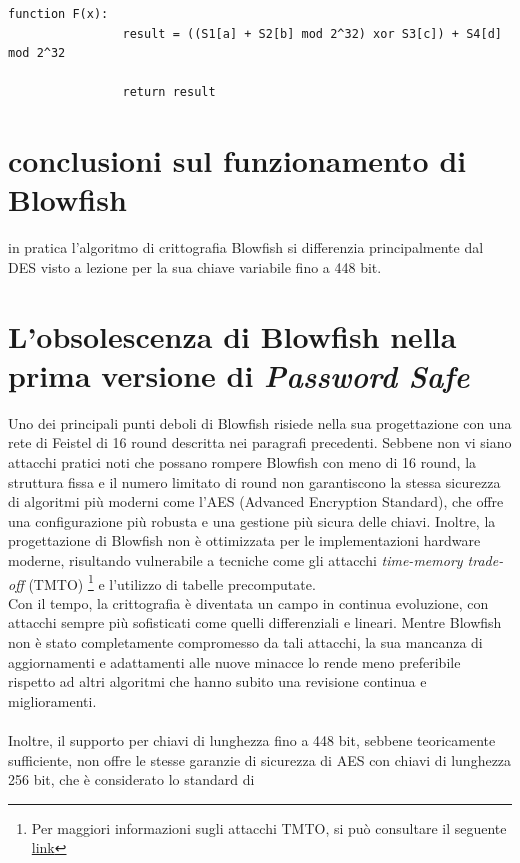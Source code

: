 \documentclass[a4paper,12pt]{report}
\begin{document}
		\begin{lstlisting}[style=pseudocode]
			function F(x):
				result = ((S1[a] + S2[b] mod 2^32) xor S3[c]) + S4[d] mod 2^32
				
				return result
		\end{lstlisting}
		\section*{conclusioni sul funzionamento di Blowfish}
		in pratica l'algoritmo di crittografia Blowfish si differenzia
		principalmente dal DES visto a lezione per la sua chiave variabile fino a
		448 bit. \cite{blfh-lenth-key}

		\section*{L'obsolescenza di Blowfish nella prima versione di
		\textit{Password Safe}}
			Uno dei principali punti deboli di Blowfish risiede nella sua
			progettazione con una rete di Feistel di 16 round descritta nei
			paragrafi precedenti. Sebbene non vi siano attacchi pratici noti che
			possano rompere Blowfish con meno di 16 round, la struttura fissa e il
			numero limitato di round non garantiscono la stessa sicurezza di
			algoritmi più moderni come l'AES (Advanced Encryption Standard), che
			offre una configurazione più robusta e una gestione più sicura delle
			chiavi. Inoltre, la progettazione di Blowfish non è ottimizzata per le
			implementazioni hardware moderne, risultando vulnerabile a tecniche come
			gli attacchi \textit{time-memory trade-off} (TMTO) \footnote{Per
			maggiori informazioni sugli attacchi TMTO, si può consultare il seguente
			\href{https://en.wikipedia.org/wiki/Time/Memory/Data_Tradeoff_attack}{link}} e
			l'utilizzo di tabelle precomputate.\\ 
			Con il tempo, la crittografia è diventata un campo in continua 
			evoluzione, con attacchi sempre più sofisticati come quelli
			differenziali e lineari. Mentre Blowfish non è stato completamente
			compromesso da tali attacchi, la sua mancanza di aggiornamenti e
			adattamenti alle nuove minacce lo rende meno preferibile rispetto ad
			altri algoritmi che hanno subito una revisione continua e miglioramenti.\\\\
			Inoltre, il supporto per chiavi di lunghezza fino a 448 bit, sebbene
			teoricamente sufficiente, non offre le stesse garanzie di sicurezza di
			AES con chiavi di lunghezza 256 bit, che è considerato lo standard di
\end{document}
